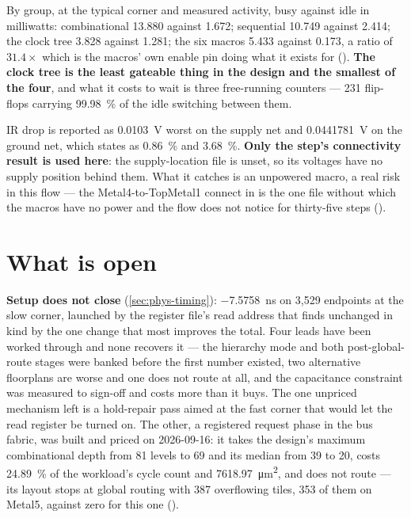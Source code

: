By group, at the typical corner and measured activity, busy against idle
in milliwatts: combinational \num{13.880} against \num{1.672};
sequential \num{10.749} against \num{2.414}; the clock tree \num{3.828}
against \num{1.281}; the six macros \num{5.433} against \num{0.173}, a
ratio of $31.4\times$ which is the macros' own enable pin doing what it
exists for (). \textbf{The clock tree is the
least gateable thing in the design and the smallest of the four}, and
what it costs to wait is three free-running counters --- 231 flip-flops
carrying \qty{99.98}{\percent} of the idle switching between them.

IR drop is reported as \qty{0.0103}{\volt} worst on the supply net and
\qty{0.0441781}{\volt} on the ground net, which 
states as \qty{0.86}{\percent} and \qty{3.68}{\percent}. \textbf{Only
the step's connectivity result is used here}: the supply-location file
is unset, so its voltages have no supply position behind them. What it
catches is an unpowered macro, a real risk in this flow --- the
Metal4-to-TopMetal1 connect in  is the one file without which the macros have no power
and the flow does not notice for thirty-five steps
().

\section{What is open}

\textbf{Setup does not close} (\cref{sec:phys-timing}):
\qty{-7.5758}{\nano\second} on 3,529
endpoints at the slow corner, launched by the register file's read address
that  finds unchanged in kind by the one change
that most improves the total. Four leads have been worked through and
none recovers it --- the hierarchy mode and both post-global-route
stages were banked before the first number existed, two alternative
floorplans are worse and one does not route at all, and the capacitance
constraint was measured to sign-off and costs more than it buys. The one unpriced mechanism left is a hold-repair pass aimed at the fast
corner that would let the read register be turned on. The other, a
registered request phase in the bus fabric, was built and priced on
2026-09-16: it takes the design's maximum combinational depth from 81
levels to 69 and its median from 39 to 20, costs
\qty{24.89}{\percent} of the workload's cycle count and
\qty{7618.97}{\um\squared}, and does not route --- its layout
 stops at global routing with 387 overflowing tiles, 353 of
them on Metal5, against zero for this one ().

